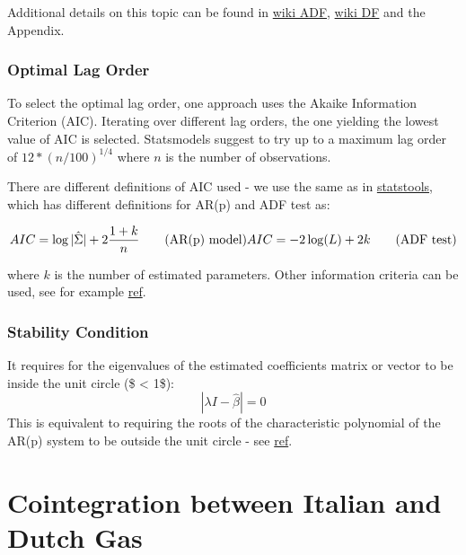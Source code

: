 \documentclass{article}
\begin{document}
Additional details on this topic can be found in
\href{https://en.wikipedia.org/wiki/Augmented_Dickey\%E2\%80\%93Fuller_test}{wiki
ADF},
\href{https://en.wikipedia.org/wiki/Dickey\%E2\%80\%93Fuller_test}{wiki
DF} and the Appendix.

    \subsubsection{Optimal Lag Order}\label{optimal-lag-order}

To select the optimal lag order, one approach uses the Akaike
Information Criterion (AIC). Iterating over different lag orders, the
one yielding the lowest value of AIC is selected. Statsmodels suggest to
try up to a maximum lag order of \(12*(n/100)^{1/4}\) where \(n\) is the
number of observations.

There are different definitions of AIC used - we use the same as in
\href{http://statsmodels.sourceforge.net/stable/vector_ar.html\#lag-order-selection}{statstools},
which has different definitions for AR(p) and ADF test as:

\[
\begin{equation}
AIC = \log | \hat{\Sigma} |+ 2 \frac{1 + k}{n} \qquad \mathrm{(AR(p) \ model)} \\
AIC = -2 \log(L) + 2k  \qquad \mathrm{(ADF \ test)} 
\end{equation}
\]

where \(k\) is the number of estimated parameters. Other information
criteria can be used, see for example
\href{https://en.wikipedia.org/wiki/Information_criterion}{ref}.

    \subsubsection{Stability Condition}\label{stability-condition}

It requires for the eigenvalues of the estimated coefficients matrix or
vector to be inside the unit circle (\$ \textless{} 1\$): \[
| \lambda I - \hat{\beta} | = 0
\] This is equivalent to requiring the roots of the characteristic
polynomial of the AR(p) system to be outside the unit circle - see
\href{http://matthieustigler.github.io/Lectures/Lect2ARMA.pdf}{ref}.

    \section{Cointegration between Italian and Dutch
Gas}\label{cointegration-between-italian-and-dutch-gas}
\end{document}
